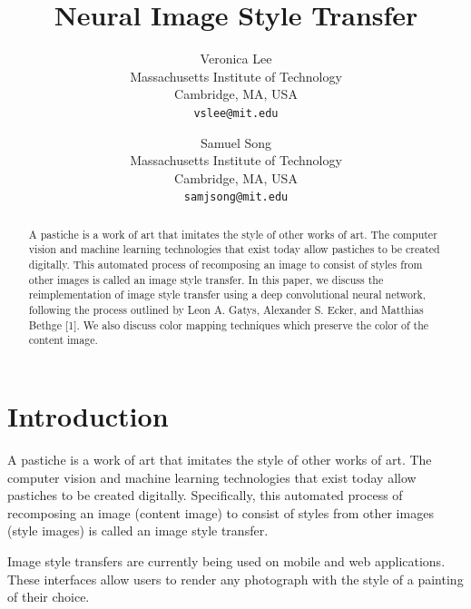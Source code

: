 \documentclass[10pt,twocolumn,letterpaper]{article}
\begin{document}
\title{Neural Image Style Transfer}

\author{Veronica Lee\\
Massachusetts Institute of Technology\\
Cambridge, MA, USA\\
{\tt\small vslee@mit.edu}
\and
Samuel Song\\
Massachusetts Institute of Technology\\
Cambridge, MA, USA\\
{\tt\small samjsong@mit.edu}
}

\maketitle

\begin{abstract}
A pastiche is a work of art that imitates the style of other works of art. The computer vision and machine learning technologies that exist today allow pastiches to be created digitally. This automated process of recomposing an image to consist of styles from other images is called an image style transfer. In this paper, we discuss the reimplementation of image style transfer using a deep convolutional neural network, following the process outlined by Leon A. Gatys, Alexander S. Ecker, and Matthias Bethge [1]. We also discuss color mapping techniques which preserve the color of the content image.
\end{abstract}

\section{Introduction}

A pastiche is a work of art that imitates the style of other works of art. The computer vision and machine learning technologies that exist today allow pastiches to be created digitally. Specifically, this automated process of recomposing an image (content image) to consist of styles from other images (style images) is called an image style transfer. 

Image style transfers are currently being used on mobile and web applications. These interfaces allow users to render any photograph with the style of a painting of their choice.
\end{document}

